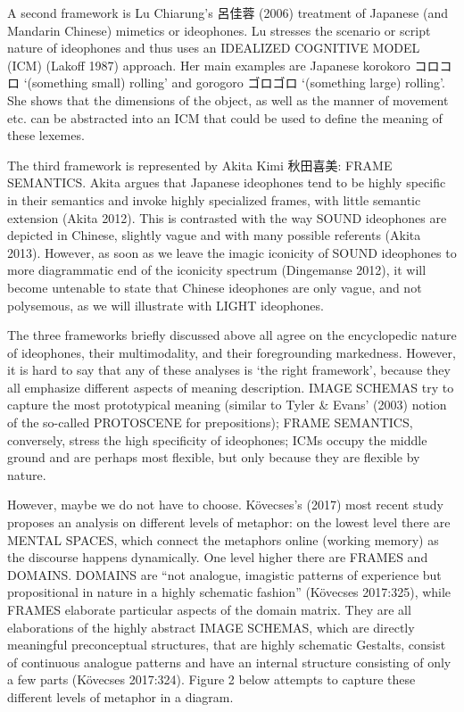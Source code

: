 \documentclass[12pt,article,oneside]{memoir}
\theoremstyle{definition}
\theoremstyle{definition}
\theoremstyle{definition}
\theoremstyle{remark}
\begin{document}
A second framework is Lu Chiarung's 呂佳蓉 (2006) treatment of Japanese
(and Mandarin Chinese) mimetics or ideophones. Lu stresses the scenario
or script nature of ideophones and thus uses an IDEALIZED COGNITIVE
MODEL (ICM) (Lakoff 1987) approach. Her main examples are Japanese
korokoro コロコロ `(something small) rolling' and gorogoro ゴロゴロ
`(something large) rolling'. She shows that the dimensions of the
object, as well as the manner of movement etc. can be abstracted into an
ICM that could be used to define the meaning of these lexemes.

The third framework is represented by Akita Kimi 秋田喜美: FRAME
SEMANTICS. Akita argues that Japanese ideophones tend to be highly
specific in their semantics and invoke highly specialized frames, with
little semantic extension (Akita 2012). This is contrasted with the way
SOUND ideophones are depicted in Chinese, slightly vague and with many
possible referents (Akita 2013). However, as soon as we leave the imagic
iconicity of SOUND ideophones to more diagrammatic end of the iconicity
spectrum (Dingemanse 2012), it will become untenable to state that
Chinese ideophones are only vague, and not polysemous, as we will
illustrate with LIGHT ideophones.

The three frameworks briefly discussed above all agree on the
encyclopedic nature of ideophones, their multimodality, and their
foregrounding markedness. However, it is hard to say that any of these
analyses is `the right framework', because they all emphasize different
aspects of meaning description. IMAGE SCHEMAS try to capture the most
prototypical meaning (similar to Tyler \& Evans' (2003) notion of the
so-called PROTOSCENE for prepositions); FRAME SEMANTICS, conversely,
stress the high specificity of ideophones; ICMs occupy the middle ground
and are perhaps most flexible, but only because they are flexible by
nature.

However, maybe we do not have to choose. Kövecses's (2017) most recent
study proposes an analysis on different levels of metaphor: on the
lowest level there are MENTAL SPACES, which connect the metaphors online
(working memory) as the discourse happens dynamically. One level higher
there are FRAMES and DOMAINS. DOMAINS are ``not analogue, imagistic
patterns of experience but propositional in nature in a highly schematic
fashion'' (Kövecses 2017:325), while FRAMES elaborate particular aspects
of the domain matrix. They are all elaborations of the highly abstract
IMAGE SCHEMAS, which are directly meaningful preconceptual structures,
that are highly schematic Gestalts, consist of continuous analogue
patterns and have an internal structure consisting of only a few parts
(Kövecses 2017:324). Figure 2 below attempts to capture these different
levels of metaphor in a diagram.
\end{document}
